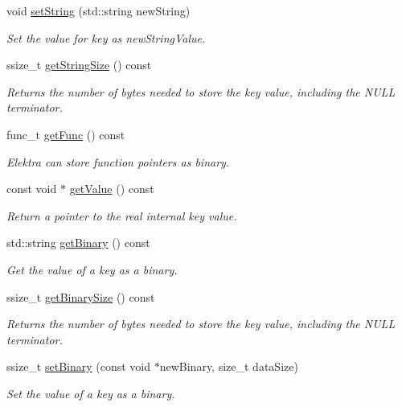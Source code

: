 \begin{DoxyCompactItemize}
\item 
void \hyperlink{classkdb_1_1Key_ab97ef37aa235f0ae04dc6e6c21109d1a}{set\+String} (std\+::string new\+String)
\begin{DoxyCompactList}\small\item\em Set the value for {\ttfamily key} as {\ttfamily new\+String\+Value}. \end{DoxyCompactList}\item 
ssize\+\_\+t \hyperlink{classkdb_1_1Key_a4cfc9941a93a94b306b8264d0d21abc2}{get\+String\+Size} () const
\begin{DoxyCompactList}\small\item\em Returns the number of bytes needed to store the key value, including the N\+U\+LL terminator. \end{DoxyCompactList}\item 
func\+\_\+t \hyperlink{classkdb_1_1Key_aa9643866a567ba5f012a3e9ab2a91721}{get\+Func} () const
\begin{DoxyCompactList}\small\item\em Elektra can store function pointers as binary. \end{DoxyCompactList}\item 
const void $\ast$ \hyperlink{classkdb_1_1Key_a444c6f254536196a7031288e9f4c3088}{get\+Value} () const
\begin{DoxyCompactList}\small\item\em Return a pointer to the real internal {\ttfamily key} value. \end{DoxyCompactList}\item 
std\+::string \hyperlink{classkdb_1_1Key_ada114aba31b321ddc984018b43a8568b}{get\+Binary} () const
\begin{DoxyCompactList}\small\item\em Get the value of a key as a binary. \end{DoxyCompactList}\item 
ssize\+\_\+t \hyperlink{classkdb_1_1Key_af33a66e7b35c0ec6f9a65105257f21aa}{get\+Binary\+Size} () const
\begin{DoxyCompactList}\small\item\em Returns the number of bytes needed to store the key value, including the N\+U\+LL terminator. \end{DoxyCompactList}\item 
ssize\+\_\+t \hyperlink{classkdb_1_1Key_af7211129a4b95f4d1e335dcd06e9bf0a}{set\+Binary} (const void $\ast$new\+Binary, size\+\_\+t data\+Size)
\begin{DoxyCompactList}\small\item\em Set the value of a key as a binary. \end{DoxyCompactList}\item 

\end{DoxyCompactItemize}
